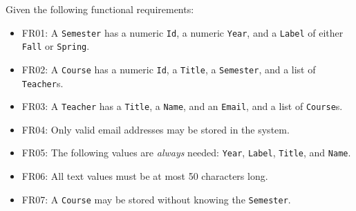
\pgfmathsetmacro{}

Given the following functional requirements:

\begin{itemize}
    \item FR01: A \texttt{Semester} has a numeric \texttt{Id}, a numeric \texttt{Year}, and a \texttt{Label} of either \texttt{Fall} or \texttt{Spring}.
    \item FR02: A \texttt{Course} has a numeric \texttt{Id}, a \texttt{Title}, a \texttt{Semester}, and a list of \texttt{Teacher}s.
    \item FR03: A \texttt{Teacher} has a \texttt{Title}, a \texttt{Name}, and an \texttt{Email}, and a list of \texttt{Course}s.
    \item FR04: Only valid email addresses may be stored in the system.
    \item FR05: The following values are \textit{always} needed: \texttt{Year}, \texttt{Label}, \texttt{Title}, and \texttt{Name}.
    \item FR06: All text values must be at most 50 characters long.
    \item FR07: A \texttt{Course} may be stored without knowing the \texttt{Semester}.
\end{itemize}

